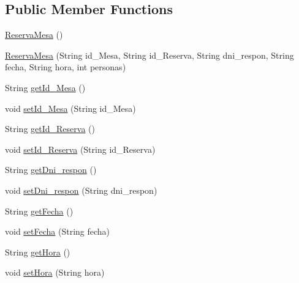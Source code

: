 \subsection*{Public Member Functions}
\begin{DoxyCompactItemize}
\item 
\mbox{\hyperlink{classes_1_1deusto_1_1spq_1_1biblioteca_1_1data_1_1_reserva_mesa_a26b46f53e77f0c742c43272ca9c76bad}{Reserva\+Mesa}} ()
\item 
\mbox{\hyperlink{classes_1_1deusto_1_1spq_1_1biblioteca_1_1data_1_1_reserva_mesa_a12f23bfbccab2c32e9e7a2794329302d}{Reserva\+Mesa}} (String id\+\_\+\+Mesa, String id\+\_\+\+Reserva, String dni\+\_\+respon, String fecha, String hora, int personas)
\item 
String \mbox{\hyperlink{classes_1_1deusto_1_1spq_1_1biblioteca_1_1data_1_1_reserva_mesa_a648a94f9af08dec222847013a9833ff7}{get\+Id\+\_\+\+Mesa}} ()
\item 
void \mbox{\hyperlink{classes_1_1deusto_1_1spq_1_1biblioteca_1_1data_1_1_reserva_mesa_afa575d7f23e7b1007d5d14fde20a5927}{set\+Id\+\_\+\+Mesa}} (String id\+\_\+\+Mesa)
\item 
String \mbox{\hyperlink{classes_1_1deusto_1_1spq_1_1biblioteca_1_1data_1_1_reserva_mesa_a9ac2f729f34f52d30c24c36a594d25d7}{get\+Id\+\_\+\+Reserva}} ()
\item 
void \mbox{\hyperlink{classes_1_1deusto_1_1spq_1_1biblioteca_1_1data_1_1_reserva_mesa_a2bd6ff081c35a0a4f1c89a1637fbde24}{set\+Id\+\_\+\+Reserva}} (String id\+\_\+\+Reserva)
\item 
String \mbox{\hyperlink{classes_1_1deusto_1_1spq_1_1biblioteca_1_1data_1_1_reserva_mesa_a538bc5d954523e684dbf1d048d422927}{get\+Dni\+\_\+respon}} ()
\item 
void \mbox{\hyperlink{classes_1_1deusto_1_1spq_1_1biblioteca_1_1data_1_1_reserva_mesa_a586784bef2e6a0d178f98ea72bc00a21}{set\+Dni\+\_\+respon}} (String dni\+\_\+respon)
\item 
String \mbox{\hyperlink{classes_1_1deusto_1_1spq_1_1biblioteca_1_1data_1_1_reserva_mesa_a291c8790dad8c2c10954cd7731d636b9}{get\+Fecha}} ()
\item 
void \mbox{\hyperlink{classes_1_1deusto_1_1spq_1_1biblioteca_1_1data_1_1_reserva_mesa_a891823d92e92ac166029e18f708ba250}{set\+Fecha}} (String fecha)
\item 
String \mbox{\hyperlink{classes_1_1deusto_1_1spq_1_1biblioteca_1_1data_1_1_reserva_mesa_aff2c846da031035b3fa01c50406655f1}{get\+Hora}} ()
\item 
void \mbox{\hyperlink{classes_1_1deusto_1_1spq_1_1biblioteca_1_1data_1_1_reserva_mesa_a9b4eb849f6c00ce6ed07ac3650f697af}{set\+Hora}} (String hora)

\end{DoxyCompactItemize}
